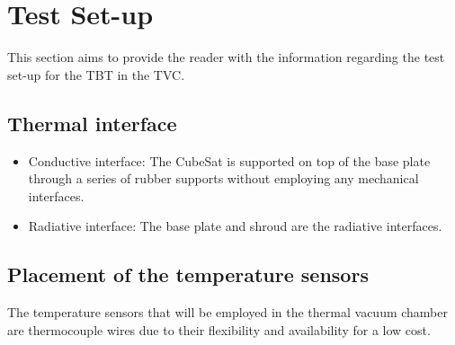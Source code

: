 \section{Test Set-up} \label{sec:Test_set_up}
This section aims to provide the reader with the information regarding the test set-up for the TBT in the TVC.

\subsection{Thermal interface}

\begin{itemize}
    \item{Conductive interface: The CubeSat is supported on top of the base plate through a series of rubber supports without employing any mechanical interfaces.}
    \item{Radiative interface: The base plate and shroud are the radiative interfaces.}
\end{itemize}

\subsection{Placement of the temperature sensors}

The temperature sensors that will be employed in the thermal vacuum chamber are thermocouple wires due to their flexibility and availability for a low cost. 

